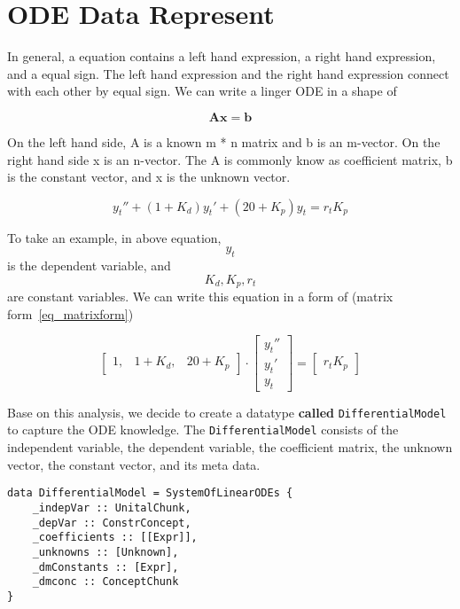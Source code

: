 \chapter{ODE Data Represent}
In general, a equation contains a left hand expression, a right hand expression, and a equal sign. The left hand expression and the right hand expression connect with each other by equal sign. We can write a linger ODE in a shape of

\begin{equation} \label{eq_matrixform}
	\boldsymbol{Ax} = \boldsymbol{b}
\end{equation}

On the left hand side, A is a known m * n matrix and b is an m-vector. On the right hand side x is an n-vector. The A is commonly know as coefficient matrix, b is the constant vector, and x is the unknown vector.

\begin{equation} \label{eq_odeexmaple}
	y_t'' + (1 + K_d)y_t' + (20 + K_p)y_t = r_t K_p
\end{equation}

To take an example, in above equation, \[y_t\] is the dependent variable, and \[K_d, K_p, r_t\] are constant variables. We can write this equation in a form of (matrix form~\ref{eq_matrixform})

\[
\begin{bmatrix}
    1, & 1 + K_{d}, & 20 + K_{p}
\end{bmatrix}
\cdot
\begin{bmatrix}
    y_{t}''  \\
    y_{t}'   \\
    y_{t}  
\end{bmatrix}
=
\begin{bmatrix}
    r_{t} K_{p} 
\end{bmatrix}
\]

Base on this analysis, we decide to create a datatype \textbf{called} \verb|DifferentialModel| to capture the ODE knowledge. The \verb|DifferentialModel| consists of the independent variable, the dependent variable, the coefficient matrix, the unknown vector, the constant vector, and its meta data.

\begin{lstlisting}[language=HaskellUlisses]
data DifferentialModel = SystemOfLinearODEs {
	_indepVar :: UnitalChunk,
	_depVar :: ConstrConcept,
	_coefficients :: [[Expr]],
	_unknowns :: [Unknown],
	_dmConstants :: [Expr],
	_dmconc :: ConceptChunk
}
\end{lstlisting}

